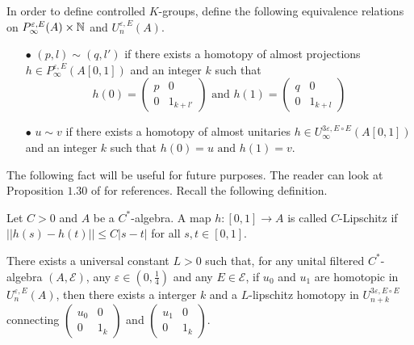 In order to define controlled $K$-groups, define the following equivalence relations on $P^{\varepsilon, E}_\infty(A)\times \mathbb N$ and $U^{\varepsilon,E}_n(A)$.\\

\begin{itemize}

\item[$\bullet$] $(p,l) \sim (q,l')$ if there exists a homotopy of almost projections $h\in P^{\varepsilon, E}_\infty(A[0,1])$ and an integer $k$ such that 
\[h(0)=\begin{pmatrix} p & 0 \\ 0 & 1_{k+l'} \end{pmatrix} \text{ and }
h(1)=\begin{pmatrix} q & 0 \\ 0 & 1_{k+l} \end{pmatrix}\]
\item[$\bullet$] $u \sim v$ if there exists a homotopy of almost unitaries $h\in U^{3\varepsilon, E\circ E}_\infty(A[0,1])$ and an integer $k$ such that $h(0)= u \text{ and }h(1)=v$.\\
\end{itemize}

The following fact will be useful for future purposes. The reader can look at Proposition $1.30$ of \cite{OY3} for references. Recall the following definition.

\begin{definition}
Let $C>0$ and $A$ be a $C^*$-algebra. A map $h : [0,1]\rightarrow A $ is called $C$-Lipschitz if $||h(s)-h(t)||\leq C|s-t|$ for all $s,t\in [0,1]$.
\end{definition}

\begin{prop}\label{Lip}
There exists a universal constant $L>0$ such that, for any unital filtered $C^*$-algebra $(A,\mathcal E)$, any $\varepsilon\in(0,\frac{1}{4})$ and  any $E\in \mathcal E$, if $u_0$ and $u_1$ are homotopic in $U_n^{\varepsilon, E}(A)$, then there exists a interger $k$ and a $L$-lipschitz homotopy in $U_{n+k}^{3\varepsilon,E\circ E}$ connecting $\begin{pmatrix} u_0 & 0 \\ 0 & 1_k\end{pmatrix}$ and $\begin{pmatrix} u_1 & 0 \\ 0 & 1_k\end{pmatrix}$. 
\end{prop}

